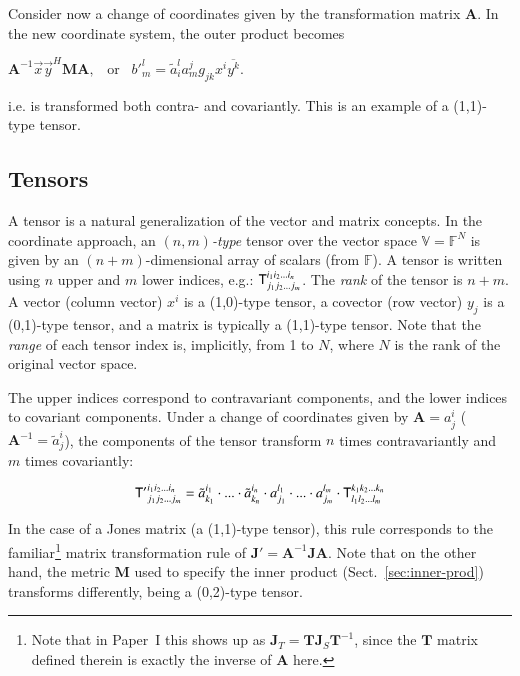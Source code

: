 \documentclass[]{aa}
\newcommand{\herm}{H}
\begin{document}
Consider now a change of coordinates given by the transformation matrix $\mathbf{A}$. In the new coordinate system, the outer product becomes

$\mathbf{A}^{-1}\vec x \vec y^\herm \mathbf{M} \mathbf{A}, \;\;\;\mbox{or}\;\;\;b'^{l}_{m} = \tilde a_i^{l}a_m^{j} g_{jk} x^i \overline{y^k}$.

i.e. is transformed both contra- and covariantly. This is an example of a (1,1)-type tensor.

\subsection{Tensors}
\label{sec:tensors}

A tensor is a natural generalization of the vector and matrix concepts. In the coordinate approach, an \emph{$(n,m)$-type} tensor over the vector space $\mathbb{V}=\mathbb{F}^N$ is given by an $(n+m)$-dimensional array of scalars (from $\mathbb{F}$). A tensor is written using $n$ upper and $m$ lower indices, e.g.: $\mathsf{T}_{j_{1}j_{2}...j_{m}}^{i_{1}i_{2}...i_{n}}$. The \emph{rank} of the tensor is $n+m$. A vector (column vector) $x^i$ is a (1,0)-type tensor, a covector (row vector) $y_j$ is a (0,1)-type tensor, and a matrix is typically a (1,1)-type tensor. Note that the \emph{range} of each tensor index is, implicitly, from 1 to $N$, where $N$ is the rank of the original vector space. 

The upper indices correspond to contravariant components, and the lower indices to covariant components. Under a change of coordinates given by $\mathbf{A}=a^i_j$ ($\mathbf{A}^{-1}=\tilde a^i_j$), the components of the tensor transform $n$ times contravariantly and $m$ times covariantly: 

\begin{equation}
  \label{eq:tensor-coord-xform}
\mathsf{T'}_{j_1j_2...j_m}^{i_1i_2...i_n} = 
\tilde a^{i_1}_{k_1}\cdot...\cdot\tilde a^{i_n}_{k_n} \cdot 
a_{j_1}^{l_1}\cdot...\cdot a_{j_m}^{l_m} \cdot
\mathsf{T}_{l_1l_2...l_m}^{k_1k_2...k_n} 
\end{equation}

In the case of a Jones matrix (a (1,1)-type tensor), this rule corresponds to the familiar\footnote{Note that in Paper~I \citep[Sect.~6.3]{RRIME1} this shows up as $\mathbf{J}_T=\mathbf{T}\mathbf{J}_S\mathbf{T}^{-1}$, since the $\mathbf{T}$ matrix defined therein is exactly the inverse of $\mathbf{A}$ here.} matrix transformation rule of $\mathbf{J}'=\mathbf{A}^{-1}\mathbf{J}\mathbf{A}.$ Note that on the other hand, the metric $\mathbf{M}$ used to specify the inner product (Sect.~\ref{sec:inner-prod}) transforms differently, being a (0,2)-type tensor.
\end{document}
